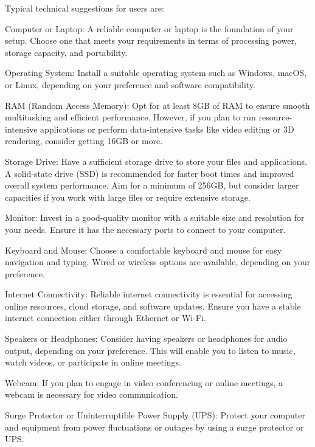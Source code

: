 
Typical technical suggestions for users are:
\begin{outline}

	\1 Computer or Laptop: A reliable computer or laptop is the foundation of your setup. 
	Choose one that meets your requirements in terms of processing power, storage capacity, and portability.

	\1  Operating System: Install a suitable operating system such as Windows, macOS, or Linux, depending on your preference and software compatibility.

	\1  RAM (Random Access Memory): Opt for at least 8GB of RAM to ensure smooth multitasking and efficient performance. However, if you plan to run resource-intensive applications or perform data-intensive tasks like video editing or 3D rendering, consider getting 16GB or more.

	\1  Storage Drive: Have a sufficient storage drive to store your files and applications. A solid-state drive (SSD) is recommended for faster boot times and improved overall system performance. Aim for a minimum of 256GB, but consider larger capacities if you work with large files or require extensive storage.

	\1  Monitor: Invest in a good-quality monitor with a suitable size and resolution for your needs. Ensure it has the necessary ports to connect to your computer.

	\1  Keyboard and Mouse: Choose a comfortable keyboard and mouse for easy navigation and typing. Wired or wireless options are available, depending on your preference.

	\1  Internet Connectivity: Reliable internet connectivity is essential for accessing online resources, cloud storage, and software updates. Ensure you have a stable internet connection either through Ethernet or Wi-Fi.

	\1  Speakers or Headphones: Consider having speakers or headphones for audio output, depending on your preference. This will enable you to listen to music, watch videos, or participate in online meetings.

	\1  Webcam: If you plan to engage in video conferencing or online meetings, a webcam is necessary for video communication.

	\1  Surge Protector or Uninterruptible Power Supply (UPS): Protect your computer and equipment from power fluctuations or outages by using a surge protector or UPS.	 
\end{outline}
  
  
  
 